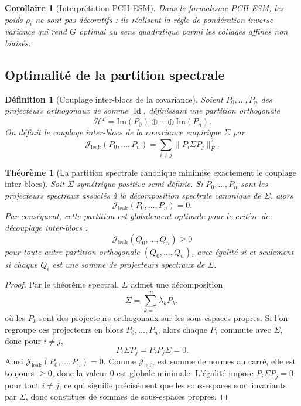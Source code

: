 \documentclass[11pt,a4paper]{article}
\newtheorem{definition}{Définition}[section]
\newtheorem{theorem}{Théorème}[section]
\newtheorem{corollary}{Corollaire}[section]
\DeclareMathOperator{\Id}{Id}
\newcommand{\Hh}{\mathcal H}
\newcommand{\1}{\mathbf 1}
\begin{document}
\begin{corollary}[Interprétation PCH-ESM]
Dans le formalisme PCH-ESM, les poids \(\rho_i\) ne sont pas décoratifs :
ils réalisent la règle de pondération inverse-variance qui rend \(G\) optimal au sens quadratique parmi les collages affines non biaisés.
\end{corollary}

\subsection{Optimalité de la partition spectrale}

\begin{definition}[Couplage inter-blocs de la covariance]
Soient \(P_0,\dots,P_n\) des projecteurs orthogonaux de somme \(\Id\), définissant une partition orthogonale
\[
\Hh^T=\mathrm{Im}(P_0)\oplus\cdots\oplus\mathrm{Im}(P_n).
\]
On définit le couplage inter-blocs de la covariance empirique \(\Sigma\) par
\[
\mathcal J_{\mathrm{leak}}(P_0,\dots,P_n)
=
\sum_{i\neq j}\|P_i\Sigma P_j\|_F^2.
\]
\end{definition}

\begin{theorem}[La partition spectrale canonique minimise exactement le couplage inter-blocs]
Soit \(\Sigma\) symétrique positive semi-définie.  
Si \(P_0,\dots,P_n\) sont les projecteurs spectraux associés à la décomposition spectrale canonique de \(\Sigma\),
alors
\[
\mathcal J_{\mathrm{leak}}(P_0,\dots,P_n)=0.
\]
Par conséquent, cette partition est globalement optimale pour le critère de découplage inter-blocs :
\[
\mathcal J_{\mathrm{leak}}(Q_0,\dots,Q_n)\ge 0
\]
pour toute autre partition orthogonale \((Q_0,\dots,Q_n)\), avec égalité si et seulement si chaque \(Q_i\) est une somme de projecteurs spectraux de \(\Sigma\).
\end{theorem}

\begin{proof}
Par le théorème spectral, \(\Sigma\) admet une décomposition
\[
\Sigma=\sum_{k=1}^m \lambda_k P_k,
\]
où les \(P_k\) sont des projecteurs orthogonaux sur les sous-espaces propres.  
Si l'on regroupe ces projecteurs en blocs \(P_0,\dots,P_n\), alors chaque \(P_i\) commute avec \(\Sigma\), donc pour \(i\neq j\),
\[
P_i\Sigma P_j
=
P_iP_j\Sigma
=
0.
\]
Ainsi \(\mathcal J_{\mathrm{leak}}(P_0,\dots,P_n)=0\).  
Comme \(\mathcal J_{\mathrm{leak}}\) est somme de normes au carré, elle est toujours \(\ge 0\), donc la valeur \(0\) est globale minimale.  
L'égalité impose \(P_i\Sigma P_j=0\) pour tout \(i\neq j\), ce qui signifie précisément que les sous-espaces sont invariants par \(\Sigma\), donc constitués de sommes de sous-espaces propres.
\end{proof}
\end{document}
